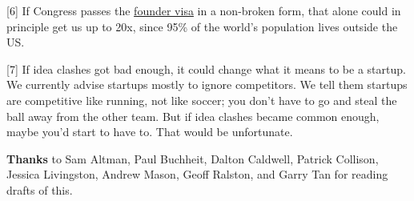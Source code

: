 {[}6{]} If Congress passes the \href{foundervisa.html}{founder visa} in
a non-broken form, that alone could in principle get us up to 20x, since
95\% of the world's population lives outside the US.

{[}7{]} If idea clashes got bad enough, it could change what it means to
be a startup. We currently advise startups mostly to ignore competitors.
We tell them startups are competitive like running, not like soccer; you
don't have to go and steal the ball away from the other team. But if
idea clashes became common enough, maybe you'd start to have to. That
would be unfortunate.

\textbf{Thanks} to Sam Altman, Paul Buchheit, Dalton Caldwell, Patrick
Collison, Jessica Livingston, Andrew Mason, Geoff Ralston, and Garry Tan
for reading drafts of this.

